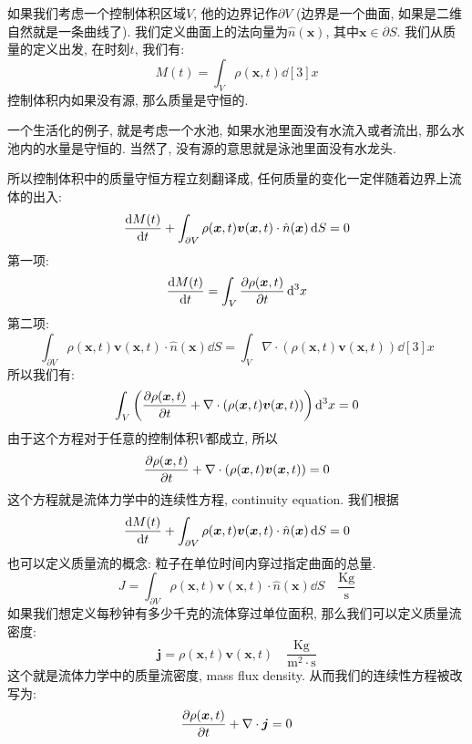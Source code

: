 如果我们考虑一个控制体积区域$V$, 他的边界记作$\partial V$ (边界是一个曲面, 如果是二维自然就是一条曲线了).
我们定义曲面上的法向量为$\hat{n}(\bm{x})$, 其中$\bm{x} \in \partial S$.
我们从质量的定义出发, 在时刻$t$, 我们有:
\begin{equation}
  M(t) = \int_V \rho(\bm{x}, t) \dd[3]{x}
\end{equation}
控制体积内如果没有源, 那么质量是守恒的.
\begin{remark}
  一个生活化的例子, 就是考虑一个水池, 如果水池里面没有水流入或者流出, 那么水池内的水量是守恒的.
  当然了, 没有源的意思就是泳池里面没有水龙头.
\end{remark} 
所以控制体积中的质量守恒方程立刻翻译成, 任何质量的变化一定伴随着边界上流体的出入:
\begin{equation}
  \dv{M(t)}{t} + \int_{\partial V} \rho(\bm{x}, t) \bm{v}(\bm{x}, t) \cdot \hat{n}(\bm{x}) \dd{S} = 0
\end{equation}
第一项:
\begin{equation}
  \dv{M(t)}{t} = \int_V \pdv{\rho(\bm{x}, t)}{t} \dd[3]{x}
\end{equation}
第二项:
\begin{equation}
  \int_{\partial V} \rho(\bm{x}, t) \bm{v}(\bm{x}, t) \cdot \hat{n}(\bm{x}) \dd{S} = \int_V \nabla \cdot (\rho(\bm{x}, t) \bm{v}(\bm{x}, t)) \dd[3]{x}
\end{equation}
所以我们有:
\begin{equation}
  \int_V \left( \pdv{\rho(\bm{x}, t)}{t} + \nabla \cdot (\rho(\bm{x}, t) \bm{v}(\bm{x}, t)) \right) \dd[3]{x} = 0
\end{equation}
由于这个方程对于任意的控制体积$V$都成立, 所以
\begin{equation}
  \pdv{\rho(\bm{x}, t)}{t} + \nabla \cdot (\rho(\bm{x}, t) \bm{v}(\bm{x}, t)) = 0
\end{equation}
这个方程就是流体力学中的连续性方程, continuity equation.
我们根据
\begin{equation}
  \dv{M(t)}{t} + \int_{\partial V} \rho(\bm{x}, t) \bm{v}(\bm{x}, t) \cdot \hat{n}(\bm{x}) \dd{S} = 0
\end{equation}
也可以定义质量流的概念: 粒子在单位时间内穿过指定曲面的总量.
\begin{equation}
  J = \int_{\partial V} \rho(\bm{x}, t) \bm{v}(\bm{x}, t) \cdot \hat{n}(\bm{x}) \dd{S} \quad \frac{\text{Kg}}{\text{s}}
\end{equation}
如果我们想定义每秒钟有多少千克的流体穿过单位面积, 那么我们可以定义质量流密度:
\begin{equation}
  \bm{j} = \rho(\bm{x}, t) \bm{v}(\bm{x}, t) \quad \frac{\text{Kg}}{\text{m}^2 \cdot \text{s}}
\end{equation}
这个就是流体力学中的质量流密度, mass flux density.
从而我们的连续性方程被改写为:
\begin{equation}
  \pdv{\rho(\bm{x}, t)}{t} + \nabla \cdot \bm{j} = 0
\end{equation}

